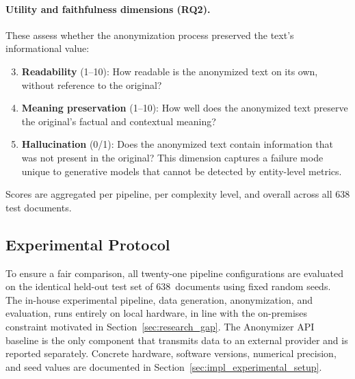 \paragraph{Utility and faithfulness dimensions (RQ2).} These assess whether
the anonymization process preserved the text's informational value:
\begin{enumerate}
    \setcounter{enumi}{2}
    \item \textbf{Readability} (1--10): How readable is the anonymized text on
    its own, without reference to the original?

    \item \textbf{Meaning preservation} (1--10): How well does the anonymized
    text preserve the original's factual and contextual meaning?

    \item \textbf{Hallucination} (0/1): Does the anonymized text contain
    information that was not present in the original? This dimension captures a
    failure mode unique to generative models that cannot be detected by
    entity-level metrics.
\end{enumerate}

Scores are aggregated per pipeline, per complexity level, and overall across all
638 test documents.


\subsection{Experimental Protocol}
\label{sec:experimental_protocol}

To ensure a fair comparison, all twenty-one pipeline configurations are
evaluated on the identical held-out test set of 638~documents using fixed
random seeds. The in-house experimental pipeline, data generation,
anonymization, and evaluation, runs entirely on local hardware, in line
with the on-premises constraint motivated in
Section~\ref{sec:research_gap}. The Anonymizer API baseline is the only
component that transmits data to an external provider and is reported
separately. Concrete hardware, software versions, numerical precision,
and seed values are documented in
Section~\ref{sec:impl_experimental_setup}.
